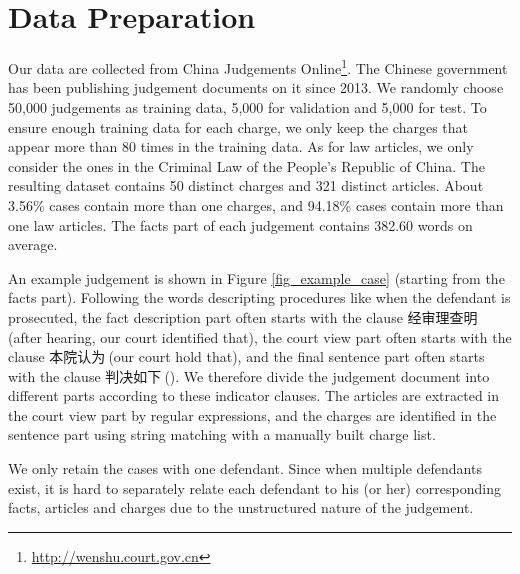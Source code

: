 \section{Data Preparation} 
Our data are collected from China Judgements Online\footnote{\url{http://wenshu.court.gov.cn}}. The Chinese government has been publishing judgement documents on it since 2013.
We randomly choose 50,000 judgements as training data, 5,000 for validation and 5,000 for test. To ensure enough training data for each charge, we only keep the charges that appear more than 80 times in the training data. As for law articles, we only consider the ones in the Criminal Law of the People's Republic of China. The resulting dataset contains 50 distinct charges and 321 distinct articles. About 3.56\% cases contain more than one charges, and 94.18\% cases contain more than one law articles. 
The facts part of each judgement contains 382.60 words on average.



An example judgement is shown in Figure \ref{fig_example_case} (starting from the facts part).
Following the words descripting procedures like when the defendant is prosecuted, the fact description part often starts with the clause 经审理查明$\ $(after hearing, our court identified that), the court view part often starts with the clause 本院认为$\ $(our court hold that), and the final sentence part often starts with the clause 判决如下$\ $(). 
We therefore divide the judgement document into different parts according to these indicator clauses. The articles are extracted in the court view part by regular expressions, and the charges are identified in the sentence part using string matching with a manually built charge list.

We only retain the cases with one defendant. Since when multiple defendants exist, it is hard to separately relate each defendant to his (or her) corresponding facts, articles and charges due to the unstructured nature of the judgement.


